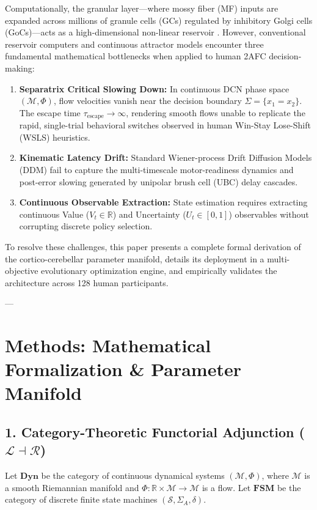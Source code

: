 \documentclass[11pt,twoside,a4paper]{article}
\begin{document}
Computationally, the granular layer—where mossy fiber (MF) inputs are expanded across millions of granule cells (GCs) regulated by inhibitory Golgi cells (GoCs)—acts as a high-dimensional non-linear reservoir \cite{buonomano2009state}. However, conventional reservoir computers and continuous attractor models encounter three fundamental mathematical bottlenecks when applied to human 2AFC decision-making:
\begin{enumerate}
    \item \textbf{Separatrix Critical Slowing Down:} In continuous DCN phase space $(\mathcal{M}, \Phi)$, flow velocities vanish near the decision boundary $\Sigma = \{x_1 = x_2\}$. The escape time $\tau_{\text{escape}} \to \infty$, rendering smooth flows unable to replicate the rapid, single-trial behavioral switches observed in human Win-Stay Lose-Shift (WSLS) heuristics.
    \item \textbf{Kinematic Latency Drift:} Standard Wiener-process Drift Diffusion Models (DDM) fail to capture the multi-timescale motor-readiness dynamics and post-error slowing generated by unipolar brush cell (UBC) delay cascades.
    \item \textbf{Continuous Observable Extraction:} State estimation requires extracting continuous Value ($V_t \in \mathbb{R}$) and Uncertainty ($U_t \in [0, 1]$) observables without corrupting discrete policy selection.
\end{enumerate}

To resolve these challenges, this paper presents a complete formal derivation of the cortico-cerebellar parameter manifold, details its deployment in a multi-objective evolutionary optimization engine, and empirically validates the architecture across 128 human participants.

---

\section{Methods: Mathematical Formalization \& Parameter Manifold}

\subsection{1. Category-Theoretic Functorial Adjunction ($\mathcal{L} \dashv \mathcal{R}$)}
Let $\mathbf{Dyn}$ be the category of continuous dynamical systems $(\mathcal{M}, \Phi)$, where $\mathcal{M}$ is a smooth Riemannian manifold and $\Phi: \mathbb{R} \times \mathcal{M} \to \mathcal{M}$ is a flow. Let $\mathbf{FSM}$ be the category of discrete finite state machines $(\mathcal{S}, \Sigma_A, \delta)$.
\end{document}
